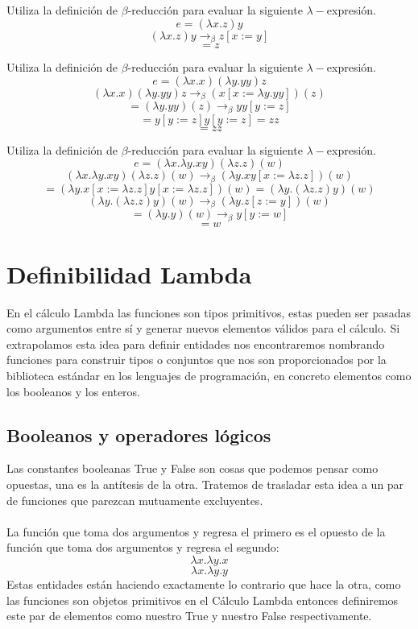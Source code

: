     \begin{exercise}
    Utiliza la definición de $\beta$-reducción para evaluar la siguiente $\lambda-$expresión.
    $$e= (\lambda x.z)y$$
    \[ (\lambda x.z)y \rightarrow_\beta  z [x := y]\]
    \[ = z \]
    \end{exercise}

    \begin{exercise}
        Utiliza la definición de $\beta$-reducción para evaluar la siguiente $\lambda-$expresión.
        $$e = (\lambda x.x)(\lambda y.yy) z$$
        \[ (\lambda x.x)(\lambda y.yy) z \rightarrow_\beta (x[x:=\lambda y.yy])(z)\]
        \[ = (\lambda y.yy)(z) \rightarrow_\beta yy[y:=z]\]
        \[ =  y[y:=z]y[y:=z] = zz\]
       \[= zz \]
    \end{exercise}

    \begin{exercise}
        Utiliza la definición de $\beta$-reducción para evaluar la siguiente $\lambda-$expresión.
        $$e= (\lambda x.\lambda y.xy)(\lambda z.z)(w)$$
        \[(\lambda x.\lambda y.xy)(\lambda z.z)(w) \rightarrow_\beta (\lambda y.xy[x := \lambda z.z])(w) \]
        \[ =  (\lambda y.x[x := \lambda z.z]y[x := \lambda z.z])(w) = (\lambda y.(\lambda z.z)y)(w) \]
        \[ (\lambda y.(\lambda z.z)y)(w) \rightarrow_\beta (\lambda y.z[z := y])(w) \]
        \[ = (\lambda y.y)(w) \rightarrow_\beta y[y := w] \]
        \[ = w \]
    \end{exercise}

    \section{Definibilidad Lambda}
    En el cálculo Lambda las funciones son tipos primitivos, estas pueden ser pasadas como argumentos entre sí y generar nuevos elementos válidos para el cálculo. Si extrapolamos esta idea para definir entidades nos encontraremos nombrando funciones para construir tipos o conjuntos que nos son proporcionados por la biblioteca estándar en los lenguajes de programación, en concreto elementos como los booleanos y los enteros.

    \subsection{Booleanos y operadores lógicos}
    Las constantes booleanas \textsf{True} y \textsf{False} son cosas que podemos pensar como opuestas, una es la antítesis de la otra. Tratemos de trasladar esta idea a un par de funciones que parezcan mutuamente excluyentes.\\\\
    La función que toma dos argumentos y regresa el primero es el opuesto de la función que toma dos argumentos y regresa el segundo:
    \[
        \lambda x.\lambda y.x
    \]
    \[
        \lambda x.\lambda y.y
    \]
    Estas entidades están haciendo exactamente lo contrario que hace la otra, como las funciones son objetos primitivos en el Cálculo Lambda entonces definiremos este par de elementos como nuestro \textsf{True} y nuestro \textsf{False} respectivamente.

